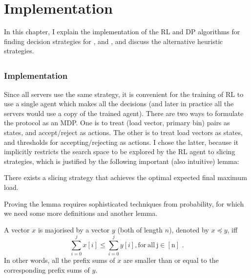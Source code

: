 \chapter{Implementation}\label{implementation}

\ifpdf
    \graphicspath{{Chapter3/Figs/Raster/}{Chapter3/Figs/PDF/}{Chapter3/Figs/}}
\else
    \graphicspath{{Chapter3/Figs/Vector/}{Chapter3/Figs/}}
\fi



In this chapter, I explain the implementation of the RL and DP algorithms for finding decision strategies for \TwoThinning, \KThinning and \GraphicalTwoChoice, and discuss the alternative heuristic strategies.


\section{\TwoThinning}


\subsection{\DQL Implementation} \label{dqn-implmentation-two-thinning}


Since all servers use the same strategy, it is convenient for the training of RL to use a single agent which makes all the decisions (and later in practice all the servers would use a copy of the trained agent). There are two ways to formulate the \TwoThinning protocol as an MDP. One is to treat (load vector, primary bin) pairs as states, and accept/reject as actions. The other is to treat load vectors as states, and thresholds for accepting/rejecting as actions. I chose the latter, because it implicitly restricts the search space to be explored by the RL agent to slicing strategies, which is justified by the following important (also intuitive) lemma:


\begin{lemma}  \label{lemma: thresholdproperty}
There exists a slicing strategy that achieves the optimal expected final maximum load.
\end{lemma}


Proving the lemma requires sophisticated techniques from probability, for which we need some more definitions and another lemma.


\begin{definition} [majorisation]
A vector $x$ is majorised by a vector $y$ (both of length $n$), denoted by $x \preccurlyeq y$, iff $$\sum_{i=0}^j x[i] \leq \sum_{i=0}^j y[i]\mathrm{, for\ all\ j\in [n]} \text{ .}$$In other words, all the prefix sums of $x$ are smaller than or equal to the corresponding prefix sums of $y$.
\end{definition}


